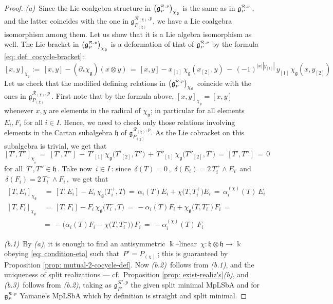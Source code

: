 \documentclass[12pt,reqno,twoside,a4paper]{amsart}
\numberwithin{equation}{section}
\theoremstyle{definition}
\newtheorem{free text}[lema]{}
\theoremstyle{remark}
\newcommand{\ot}{\otimes}
\newcommand{\R}{{\mathcal R}}
\def \Ppicc {{\scriptscriptstyle P}}
\def \lieg{\mathfrak{g}}
\def \liegRpP{\mathfrak{g}^{\raise1pt\hbox{$ \scriptscriptstyle \mathcal{R},p $}}_\Ppicc}
\def \lieh{\mathfrak{h}}
\def \pf{\begin{proof}}
\def \epf{\end{proof}}
\theoremstyle{plain}
\begin{document}
\pf
%
 \textit{(a)}\, Since the Lie coalgebra structure in
 $ {\big( \liegRpP \big)}_{\chi_\lieg} $  is the same as in  $ \liegRpP \, $,
 and the latter coincides with the one in
 $ \lieg_{P_{(\chi)}}^{\R_{(\chi)},p} $, we have a Lie coalgebra isomorphism among them.
 Let us show that it is a Lie algebra isomorphism as well.
 The Lie bracket in  $ {\big( \liegRpP \big)}_{\chi_\lieg} $
 is a deformation of that of  $ \liegRpP $ by the formula
 \eqref{eq: def_cocycle-bracket}:
%
$$
  [x,y ]_{\chi_\lieg} := \, [x,y] - (\partial_{*} \chi_\lieg)(x\ot y)\, =
  \, [x,y] - x_{[1]} \, \chi_\lieg(x_{[2]},y) \, - \, {(-1)}^{|x| |y_{[1]}|} \, y_{[1]} \, \chi_\lieg(x,y_{[2]})
$$
%
 Let us check that the modified defining relations in
 $ {\big( \liegRpP \big)}_{\chi_\lieg} $  coincide with the ones in
 $ \lieg_{P_{(\chi)}}^{\R_{(\chi)},p} \, $. First note that by the formula above,
 $[x,y ]_{\chi_\lieg} = [x,y ]$ whenever $x,y$ are elements in the radical of
 $\chi_\lieg$; in particular for all elements $E_i, F_i$ for all $i\in I$.
 Hence, we need to check only those relations involving elements in
 the Cartan subalgebra  $ \lieh $  of  $ \lieg_{P_{(\chi)}}^{\R_{(\chi)},p} $.
 As the Lie cobracket on this subalgebra is trivial, we get that
%
  $$  {[T',T'']}_{\chi_{{}_\lieg}}  \, = \;  [T',T''] \, - \, T'_{[1]} \, \chi_\lieg\big(T'_{[2]},T''\big) \, +
  \, T''_{[1]} \, \chi_\lieg\big(T''_{[2]},T'\big)  \, = \,  [T',T'']  \, = \,  0  $$
%
 for all  $ \, T', T'' \in \lieh \, $.  Take now  $ \, i \in I \, $:  since
 $ \, \delta(T) = 0 \, $,  $ \, \delta(E_i) = 2 \, T_i^+ \!\wedge E_i \, $  and
 $ \, \delta(F_i) = 2 \, T_i^- \!\wedge F_i \, $,  \,we get that
%
\begin{align*}
   {[T,E_i]}_{\chi_\lieg}  &  \, = \,  [T,E_i] - E_i \, \chi_\lieg\big(T_i^+,T\big)  \, = \,
   \alpha_i(T) E_i + \chi\big(T, T_i^+\big) E_i  \, = \, \alpha_i^{(\chi)}(T)  \, E_i  \\
   {[T,F_i]}_{\chi_\lieg}  &  \, = \,  [T,F_i] - F_i \, \chi_\lieg\big(T_i^-,T\big)  \, = \,
   -\alpha_i(T) F_i + \chi_{\lieg}\big(T, T_i^-\big) \, F_i  \, =  \\
   &  = \,  -\Big(\alpha_i(T) F_i - \chi\big(T,T_i^-\big)\Big) \, F_i  \, =
   \,  -\alpha_i^{(\chi)}(T)\, F_i
%
\end{align*}

%
 \vskip7pt
%
   \textit{(b.1)}\, By  \textit{(a)},  it is enough to find an antisymmetric
   $ \Bbbk $--linear
  $ \, \chi : \lieh \otimes \lieh \!\longrightarrow\! \Bbbk \, $  obeying
  \eqref{eq: condition-eta} such that
  $ \, P' = P_{(\chi)} \, $;
  this is guaranteed by  Proposition \ref{prop: mutual-2-cocycle-def}.  Now
\textit{(b.2)}\, follows from  \textit{(b.1)},
and the uniqueness of split realizations
   --- cf.\ Proposition \ref{prop: exist-realiz's}\textit{(b)}, and
   \textit{(b.3)}\,  follows from \textit{(b.2)},  taking as
   $ \lieg_{\scriptscriptstyle P'}^{\scriptscriptstyle \R',p} $
   the given split minimal MpLSbA and for  $ \liegRpP $  Yamane's  MpLSbA
   which by definition is straight and split minimal.
%
\epf
\end{document}
